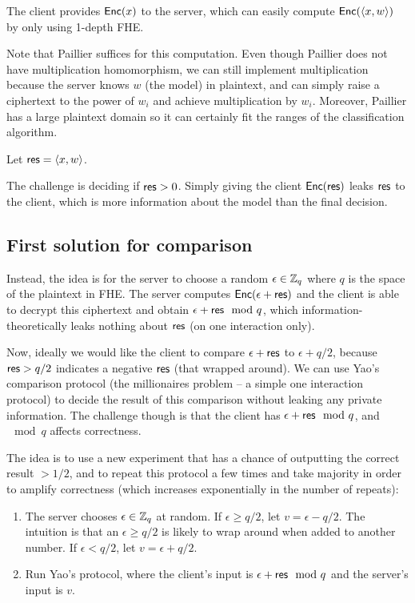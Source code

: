 \documentclass[11pt]{article}
\begin{document}
The client provides $\mathsf{Enc}(x)$ to the server, which can easily compute
$\mathsf{Enc}(\langle x, w \rangle)$ by only using 1-depth FHE. 

Note that Paillier suffices for this computation. Even though Paillier does not have multiplication homomorphism, we can still implement
multiplication because the server knows $w$ (the model) in plaintext, and can simply raise a ciphertext to the power of $w_i$ and achieve multiplication by $w_i$. Moreover, Paillier has a large plaintext domain so it can certainly fit the ranges of the classification algorithm. 

Let $\mathsf{res} = \langle x,
w \rangle$.

The challenge is deciding if $\mathsf{res} > 0$. Simply giving the client $\mathsf{Enc}(\mathsf{res})$ leaks $\mathsf{res}$ to the client, which is more information about the model than the final decision.
                            
\subsection{First solution for comparison} %
\label{sub:first_solution_for_comparison}

Instead, the idea is for the server to choose a random $\epsilon \in {\mathbb Z}_q$ where $q$ is the space of the plaintext in FHE. The server computes $\mathsf{Enc}(\epsilon + \mathsf{res})$ and the client is able to decrypt this ciphertext and obtain $\epsilon + \mathsf{res} \mod q$, which information-theoretically leaks nothing about $\mathsf{res}$ (on one interaction only).

Now, ideally we would like the client to compare $\epsilon + \mathsf{res}$ to $\epsilon + q/2$, because $\mathsf{res} > q/2$ indicates a negative $\mathsf{res}$ (that wrapped around). We can use Yao's comparison protocol (the millionaires problem -- a simple one interaction protocol) to decide the result of this comparison without leaking any private information. The challenge though is that the client has $\epsilon + \mathsf{res} \mod q$, and $\mod q$ affects correctness.

The idea is to use a new experiment that has a chance of outputting the correct result $>1/2$, and to repeat this protocol a few times and take majority in order to amplify correctness (which increases exponentially in the number of repeats):

\newcommand{\eps}{\epsilon}

\begin{enumerate}
\item
    The server chooses $\epsilon \in {\mathbb Z}_q$ at random. If $\epsilon \geq q/2$,
    let $v = \eps - q/2$. The intuition is that an $\eps \geq q/2$ is likely to
    wrap around when added to another number. If $\eps < q/2$, let $v = \eps +
    q/2$.
\item Run Yao's protocol, where the client's input is $\eps + \res \mod q$ and the server's input is $v$.
\end{enumerate}
\end{document}
